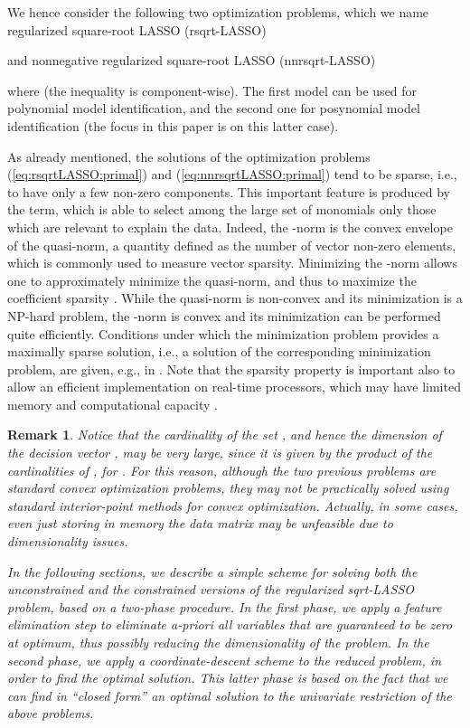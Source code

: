 \documentclass[11pt]{article}
\newcommand{\qed}{{\hfill }}
\newtheorem{remark}{Remark}
\begin{document}
We hence consider the following two optimization problems, which
we name regularized square-root LASSO (rsqrt-LASSO)

and nonnegative regularized square-root LASSO (nnrsqrt-LASSO)

where  (the
inequality is component-wise). The first model can be used for polynomial model identification, and the second one for posynomial model identification (the focus in this paper is on this latter case).

As already mentioned, the solutions of the optimization problems (\ref{eq:rsqrtLASSO:primal})
and (\ref{eq:nnrsqrtLASSO:primal}) tend to be sparse, i.e., to have only a few non-zero components. This important feature is produced
by the  term, which is able to select among the large set
of monomials only those which are relevant to explain the data.
Indeed, the -norm is the convex envelope of the 
quasi-norm, a quantity defined as the number of vector non-zero elements,
which is commonly used to measure vector sparsity. 
Minimizing
the -norm allows one to approximately minimize the  quasi-norm,
and thus to maximize the coefficient sparsity \cite{Fuchs05,Tropp06,Donoho06_2,Candes06_2}.
While the  quasi-norm is non-convex and its minimization
is a NP-hard problem, the -norm is convex and its minimization
can be performed quite efficiently. Conditions under which the 
minimization problem provides a maximally sparse solution, i.e., a
solution of the corresponding  minimization problem, are
given, e.g., in \cite{NoTAC12}. Note that the sparsity property is
important also to allow an efficient implementation on real-time processors,
which may have limited memory and computational capacity \cite{NoFaMiAUT13}.

\begin{remark}\rm Notice that the cardinality  of the set , and hence the dimension of the decision vector , may be
very large, since it is given by the product of the cardinalities of , for .
For this reason, although the two previous problems are standard convex optimization problems, they may
not be practically solved using standard interior-point methods for convex optimization. Actually, in some cases, even just storing in memory the data matrix  may be unfeasible due to dimensionality issues.\qed

In the following sections, we describe a simple scheme for solving both the unconstrained and the constrained versions
of the regularized sqrt-LASSO problem, based on a two-phase procedure. 
In the first phase, we apply a feature elimination step to eliminate a-priori all variables that are guaranteed to be zero at optimum, thus possibly reducing the dimensionality of the problem. In the second phase, we apply a coordinate-descent scheme to the reduced problem, in order to find the optimal solution. This latter phase is based on the fact that we can find in ``closed form'' an optimal solution to the univariate restriction of the above problems. 
\end{remark}
\end{document}
